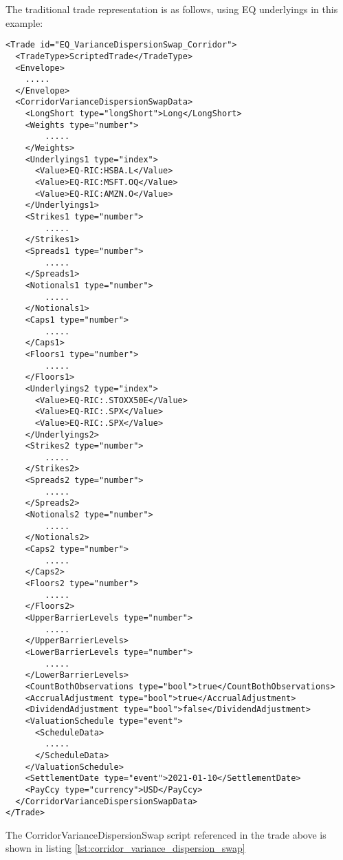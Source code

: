The traditional trade representation is as follows, using EQ underlyings in this example:

\begin{verbatim}
<Trade id="EQ_VarianceDispersionSwap_Corridor">
  <TradeType>ScriptedTrade</TradeType>
  <Envelope>
    .....
  </Envelope>
  <CorridorVarianceDispersionSwapData>
    <LongShort type="longShort">Long</LongShort>
    <Weights type="number">
        .....
    </Weights>
    <Underlyings1 type="index">
      <Value>EQ-RIC:HSBA.L</Value>
      <Value>EQ-RIC:MSFT.OQ</Value>
      <Value>EQ-RIC:AMZN.O</Value>
    </Underlyings1>
    <Strikes1 type="number">
        .....
    </Strikes1>
    <Spreads1 type="number">
        .....
    </Spreads1>
    <Notionals1 type="number">
        .....
    </Notionals1>
    <Caps1 type="number">
        .....
    </Caps1>
    <Floors1 type="number">
        .....
    </Floors1>
    <Underlyings2 type="index">
      <Value>EQ-RIC:.STOXX50E</Value>
      <Value>EQ-RIC:.SPX</Value>
      <Value>EQ-RIC:.SPX</Value>
    </Underlyings2>
    <Strikes2 type="number">
        .....
    </Strikes2>
    <Spreads2 type="number">
        .....
    </Spreads2>
    <Notionals2 type="number">
        .....
    </Notionals2>
    <Caps2 type="number">
        .....
    </Caps2>
    <Floors2 type="number">
        .....
    </Floors2>
    <UpperBarrierLevels type="number">
        .....
    </UpperBarrierLevels>
    <LowerBarrierLevels type="number">
        .....
    </LowerBarrierLevels>
    <CountBothObservations type="bool">true</CountBothObservations>
    <AccrualAdjustment type="bool">true</AccrualAdjustment>
    <DividendAdjustment type="bool">false</DividendAdjustment>
    <ValuationSchedule type="event">
      <ScheduleData>
        .....
      </ScheduleData>
    </ValuationSchedule>
    <SettlementDate type="event">2021-01-10</SettlementDate>
    <PayCcy type="currency">USD</PayCcy>
  </CorridorVarianceDispersionSwapData>
</Trade>
\end{verbatim}

The CorridorVarianceDispersionSwap script referenced in the trade above is shown in listing
\ref{lst:corridor_variance_dispersion_swap}

